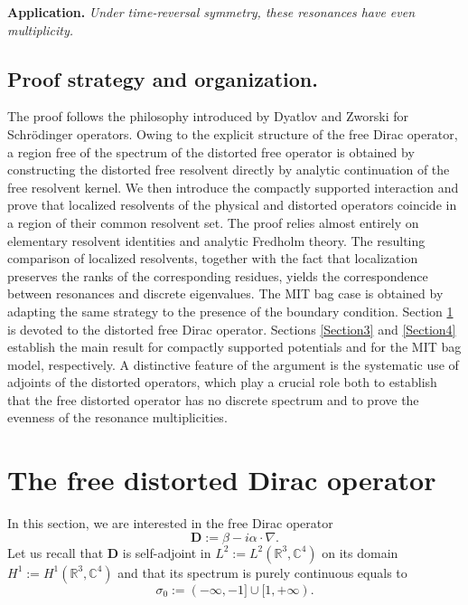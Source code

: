 \documentclass[a4paper, 12pt]{amsart}
\numberwithin{equation}{section}
\newcommand{\C}{\mathbb{C}} %
\newcommand{\R}{\mathbb{R}} %
\newcommand{\Dvec}{\mathbf{D}}
\begin{document}
\medskip

\textbf{Application.} \textit{Under time-reversal symmetry, these resonances have even multiplicity.}

\subsection*{Proof strategy and organization.} The proof follows the philosophy introduced by Dyatlov and Zworski \cite{DyZw19} for Schrödinger operators. Owing to the explicit structure of the free Dirac operator, a region free of the spectrum of the distorted free operator is obtained by constructing the distorted free resolvent directly by analytic continuation of the free resolvent kernel. We then introduce the compactly supported interaction and prove that localized resolvents of the physical and distorted operators coincide in a region of their common resolvent set. The proof relies almost entirely on elementary resolvent identities and analytic Fredholm theory. The resulting comparison of localized resolvents, together with the fact that localization preserves the ranks of the corresponding residues, yields the correspondence between resonances and discrete eigenvalues. The MIT bag case is obtained by adapting the same strategy to the presence of the boundary condition. Section \ref{Section2} is devoted to the distorted free Dirac operator. Sections \ref{Section3} and \ref{Section4} establish the main result for compactly supported potentials and for the MIT bag model, respectively. A distinctive feature of the argument is the systematic use of adjoints of the distorted operators, which play a crucial role both to establish that the free distorted operator has no discrete spectrum and to prove the evenness of the resonance multiplicities.

\section{The free distorted Dirac operator}\label{Section2}

In this section, we are interested in the free Dirac operator 
\begin{equation}\label{FreeDirac}
    \Dvec:=\beta-i\alpha\cdot\nabla.
\end{equation}
Let us recall that $\Dvec$ is self-adjoint in $L^2:=L^2(\R^3,\C^4)$ on its domain $H^1:=H^1(\R^3,\C^4)$ and that its spectrum is purely continuous equals to 
\begin{equation*}\label{FreeDiracSpectrum}
    \sigma_0:=(-\infty,-1]\cup[1,+\infty).
\end{equation*}
\end{document}
